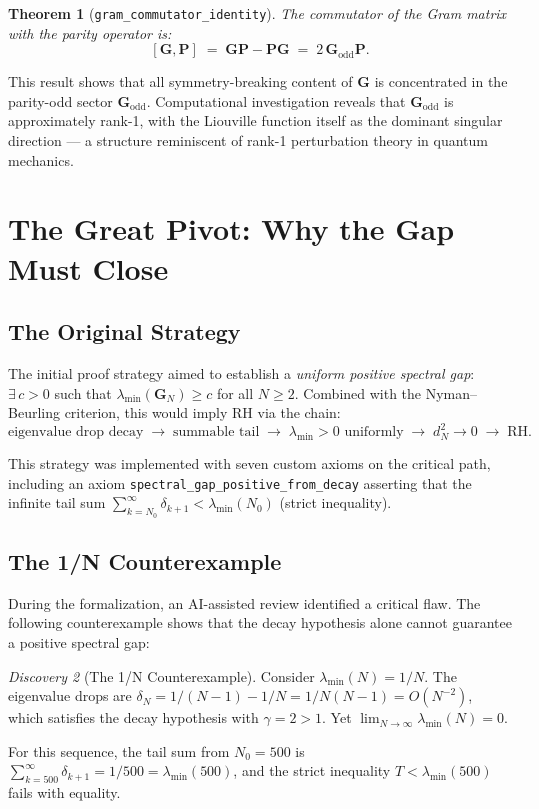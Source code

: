 \documentclass[11pt,a4paper]{article}
\newtheorem{theorem}{Theorem}[section]
\theoremstyle{definition}
\theoremstyle{remark}
\newtheorem{discovery}[theorem]{Discovery}
\newcommand{\Gram}{\mathbf{G}}
\newcommand{\Godd}{\mathbf{G}_{\mathrm{odd}}}
\newcommand{\lmin}{\lambda_{\min}}
\newcommand{\Parity}{\mathbf{P}}
\newcommand{\lean}[1]{\texttt{#1}}
\begin{document}
\begin{theorem}[\lean{gram\_commutator\_identity}]\label{thm:commutator}
The commutator of the Gram matrix with the parity operator is:
\[
  [\Gram, \Parity] \;=\; \Gram\Parity - \Parity\Gram \;=\; 2\,\Godd\Parity.
\]
\end{theorem}

This result shows that all symmetry-breaking content of $\Gram$ is
concentrated in the parity-odd sector $\Godd$. Computational investigation
reveals that $\Godd$ is approximately rank-1, with the Liouville function
itself as the dominant singular direction --- a structure reminiscent
of rank-1 perturbation theory in quantum mechanics.

\section{The Great Pivot: Why the Gap Must Close}\label{sec:pivot}

\subsection{The Original Strategy}

The initial proof strategy aimed to establish a \emph{uniform positive
spectral gap}: $\exists\, c > 0$ such that $\lmin(\Gram_N) \geq c$
for all $N \geq 2$. Combined with the Nyman--Beurling criterion, this
would imply RH via the chain:
\[
  \text{eigenvalue drop decay}
  \;\longrightarrow\;
  \text{summable tail}
  \;\longrightarrow\;
  \lmin > 0 \text{ uniformly}
  \;\longrightarrow\;
  d_N^2 \to 0
  \;\longrightarrow\;
  \text{RH}.
\]

This strategy was implemented with seven custom axioms on the critical
path, including an axiom \lean{spectral\_gap\_positive\_from\_decay}
asserting that the infinite tail sum
$\sum_{k=N_0}^{\infty} \delta_{k+1} < \lmin(N_0)$ (strict inequality).

\subsection{The 1/N Counterexample}

During the formalization, an AI-assisted review identified a critical
flaw. The following counterexample shows that the decay hypothesis
alone cannot guarantee a positive spectral gap:

\begin{discovery}[The 1/N Counterexample]\label{disc:counterexample}
Consider $\lmin(N) = 1/N$. The eigenvalue drops are
$\delta_N = 1/(N-1) - 1/N = 1/N(N-1) = O(N^{-2})$,
which satisfies the decay hypothesis with $\gamma = 2 > 1$.
Yet $\lim_{N\to\infty} \lmin(N) = 0$.

For this sequence, the tail sum from $N_0 = 500$ is
$\sum_{k=500}^{\infty} \delta_{k+1} = 1/500 = \lmin(500)$,
and the strict inequality $T < \lmin(500)$ fails with equality.
\end{discovery}
\end{document}
